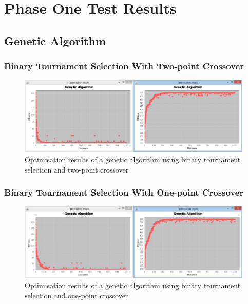 \chapter{Phase One Test Results}

\begin{landscape}
\section{Genetic Algorithm}
\subsection{Binary Tournament Selection With Two-point Crossover}
\label{sec:appendix3}
  \begin{figure}[h]
    \begin{center}
      \includegraphics{Figures/ga_bt_2p}
    \end{center}
    \caption{Optimisation results of a genetic algorithm using binary tournament selection and two-point crossover}
    \label{fig:phase1}
  \end{figure}
\end{landscape}

\begin{landscape}
\subsection{Binary Tournament Selection With One-point Crossover}
\label{sec:appendix4}
  \begin{figure}[h]
    \begin{center}
      \includegraphics{Figures/ga_bt_1p}
    \end{center}
    \caption{Optimisation results of a genetic algorithm using binary tournament selection and one-point crossover}
    \label{fig:phase1}
  \end{figure}
\end{landscape}

